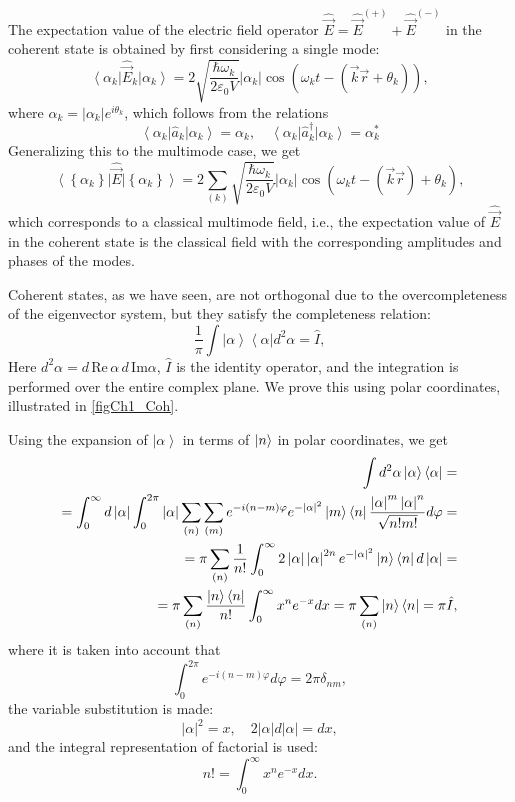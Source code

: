 The expectation value of the electric field operator $\hat{\vec{E}} =
\hat{\vec{E}}^{(+)} + \hat{\vec{E}}^{(-)}$ in the coherent state is obtained by first considering a single mode: 
\[
\left<\alpha_{k}\right|\hat{\vec{E}}_k\left|\alpha_{k}\right> = 2
\sqrt{\frac{\hbar \omega_k}{2 \varepsilon_0
V}}\left|\alpha_{k}\right|\cos 
\left(\omega_k t - \left(\vec{k} \vec{r} + \theta_k\right) \right),
\]
where $\alpha_k = \left|\alpha_{k}\right| e^{i \theta_k}$, which follows from the relations
\[
\left<\alpha_k\right|\hat{a}_k\left|\alpha_k\right> = \alpha_k, \quad
\left<\alpha_k\right|\hat{a}^{\dag}_k\left|\alpha_k\right> = \alpha^{*}_k
\]
Generalizing this to the multimode case, we get
\begin{equation}
\left<\left\{\alpha_{k}\right\}\right|\hat{\vec{E}}\left|\left\{\alpha_{k}\right\}\right>
= 2 \sum_{(k)} \sqrt{\frac{\hbar \omega_k}{2 \varepsilon_0
V}} \left|\alpha_k\right|\cos \left(\omega_k t -
\left(\vec{k}\vec{r}\right) + \theta_k \right),
\end{equation}
which corresponds to a classical multimode field, i.e., the expectation value of $\hat{\vec{E}}$ in the coherent state is the classical field with the corresponding amplitudes and phases of the modes. 

Coherent states, as we have seen, are not orthogonal due to the overcompleteness of the eigenvector system, but they satisfy the completeness relation: 
\begin{equation}
\frac{1}{\pi}\int \left|\alpha\right>\left<\alpha\right| d^2 \alpha =
\hat{I},
\label{eqCh1_full4coh}
\end{equation}
Here $d^2 \alpha = d\, \mathrm{Re}\, \alpha\, d\, \mathrm{Im} \alpha$, $\hat{I}$ is the identity operator, and the integration is performed over the entire complex plane. We prove this using polar coordinates,
illustrated in \autoref{figCh1_Coh}.  



Using the expansion of $\left|\alpha\right>$ in terms of $\ket{n}$ in
polar coordinates, we get 
\begin{eqnarray}
\int d^2 \alpha \left|\alpha\right>\left<\alpha\right| =
\nonumber \\
=
\int_0^{\infty} d \left|\alpha\right|\int_0^{2
  \pi}\left|\alpha\right|\sum_{(n)}\sum_{(m)}e^{-i \left(n -
  m\right)\varphi}
e^{-\left|\alpha\right|^2}\ket{m}\bra{n}
\frac{\left|\alpha\right|^m \left|\alpha\right|^n}{\sqrt{n! m!}} d\varphi
= 
\nonumber \\
= \pi \sum_{(n)}\frac{1}{n!}\int_0^{\infty} 2
\left|\alpha\right|\left|\alpha\right|^{2n} e^{-\left|\alpha\right|^2} 
\ket{n}\bra{n}
d\left|\alpha\right| = 
\nonumber \\
=
\pi
\sum_{(n)}\frac{\ket{n}\bra{n}}{n!} \int_0^{\infty}x^n
e^{-x}dx = 
\pi \sum_{(n)}\ket{n}\bra{n} = \pi \hat{I},
\end{eqnarray}
where it is taken into account that
\[
\int_0^{2\pi} e^{-i \left(n - m\right)\varphi} d\varphi = 2 \pi \delta_{nm},
\]
the variable substitution is made:  
\[
\left|\alpha\right|^2 = x, \quad 2 \left|\alpha\right| d
\left|\alpha\right| = d x,
\]
and the integral representation of factorial is used:
\[
n! = \int_0^{\infty}x^n e^{-x} dx.
\]

